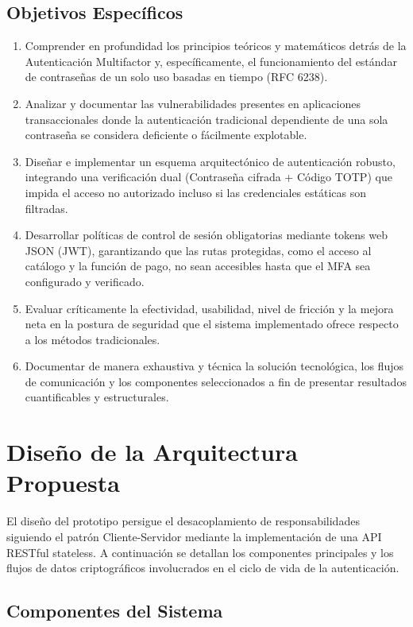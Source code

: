 \documentclass[12pt,a4paper]{article}
\begin{document}
\subsection{Objetivos Específicos}
\begin{enumerate}
    \item Comprender en profundidad los principios teóricos y matemáticos detrás de la Autenticación Multifactor y, específicamente, el funcionamiento del estándar de contraseñas de un solo uso basadas en tiempo (RFC 6238).
    \item Analizar y documentar las vulnerabilidades presentes en aplicaciones transaccionales donde la autenticación tradicional dependiente de una sola contraseña se considera deficiente o fácilmente explotable.
    \item Diseñar e implementar un esquema arquitectónico de autenticación robusto, integrando una verificación dual (Contraseña cifrada + Código TOTP) que impida el acceso no autorizado incluso si las credenciales estáticas son filtradas.
    \item Desarrollar políticas de control de sesión obligatorias mediante tokens web JSON (JWT), garantizando que las rutas protegidas, como el acceso al catálogo y la función de pago, no sean accesibles hasta que el MFA sea configurado y verificado.
    \item Evaluar críticamente la efectividad, usabilidad, nivel de fricción y la mejora neta en la postura de seguridad que el sistema implementado ofrece respecto a los métodos tradicionales.
    \item Documentar de manera exhaustiva y técnica la solución tecnológica, los flujos de comunicación y los componentes seleccionados a fin de presentar resultados cuantificables y estructurales.
\end{enumerate}

\section{Diseño de la Arquitectura Propuesta}

El diseño del prototipo persigue el desacoplamiento de responsabilidades siguiendo el patrón Cliente-Servidor mediante la implementación de una API RESTful stateless. A continuación se detallan los componentes principales y los flujos de datos criptográficos involucrados en el ciclo de vida de la autenticación.

\subsection{Componentes del Sistema}
\end{document}
